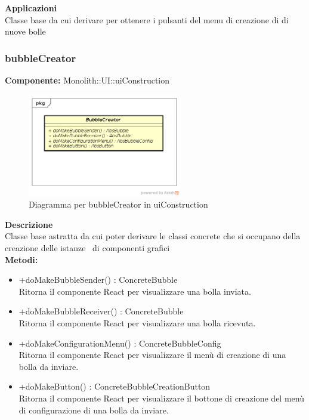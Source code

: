 \textbf{Applicazioni}\\
Classe base da cui derivare per ottenere i pulsanti del menu di creazione di di nuove bolle 


\clearpage

\subsubsection{bubbleCreator}
\textbf{Componente:}  Monolith::UI::uiConstruction\\
   \FloatBarrier
   \begin{figure}[ht]
   \centering
   \includegraphics[width=0.6\textwidth]{img/single-bubbleCreator}
   \caption{{Diagramma per bubbleCreator in uiConstruction}}
\end{figure}
\FloatBarrier
\textbf{Descrizione}\\
Classe base astratta da cui poter derivare le classi concrete che si occupano della creazione delle istanze  di componenti grafici  \\ 
\textbf{Metodi:}
\begin{itemize}
\item +doMakeBubbleSender() : ConcreteBubble 
\\
Ritorna il componente React per visualizzare una bolla inviata.
\item +doMakeBubbleReceiver() : ConcreteBubble 
\\
Ritorna il componente React per visualizzare una bolla ricevuta.
\item +doMakeConfigurationMenu() : ConcreteBubbleConfig 
\\
Ritorna il componente React per visualizzare il menù di creazione di una bolla da inviare.
\item +doMakeButton() : ConcreteBubbleCreationButton 
\\
Ritorna il componente React per visualizzare il bottone di creazione del menù di configurazione di una bolla da inviare.

\end{itemize} 


